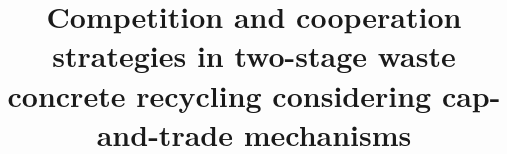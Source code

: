\documentclass[authoryear,preprint,review,times,10pt]{elsarticle}
\begin{document}
\newtheorem{prop}{Proposition}

\modulolinenumbers[1]
\runninglinenumbers
\begin{frontmatter}

\title{Competition and cooperation strategies in two-stage waste concrete recycling considering cap-and-trade mechanisms}

%
%
%
%

\begin{abstract}
\end{abstract}

\begin{keyword}
\end{keyword}

\end{frontmatter}

\end{document}
